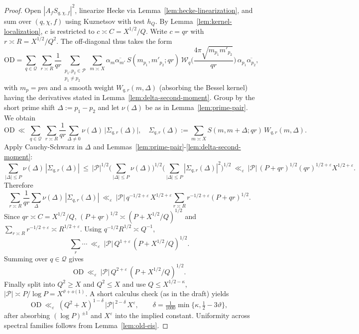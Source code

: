 \documentclass[11pt]{article}
\theoremstyle{definition}
\theoremstyle{remark}
\begin{document}
\begin{proof}
	Open $|A_f S_{q,\chi,f}|^2$, linearize Hecke via Lemma~\ref{lem:hecke-linearization}, and sum over $(q,\chi,f)$ using Kuznetsov with test $h_Q$. By Lemma~\ref{lem:kernel-localization}, $c$ is restricted to $c\asymp C=X^{1/2}/Q$. Write $c=qr$ with $r\asymp R=X^{1/2}/Q^2$. The off-diagonal thus takes the form
	\[
		\mathrm{OD}
		=\sum_{q\in\mathcal Q}\ \sum_{r\asymp R}\frac{1}{qr}
		\sum_{\substack{p_1,p_2\in\mathcal P\\ p_1\ne p_2}}
		\sum_{m\asymp X}\!\alpha_m\overline{\alpha_{m'}}\,
		S(m_{p_1},m'_{p_2};qr)\,
		\mathcal W_q\!\Big(\frac{4\pi\sqrt{m_{p_1}m'_{p_2}}}{qr}\Big)\,\alpha_{p_1}\overline{\alpha_{p_2}},
	\]
	with $m_{p}=pm$ and a smooth weight $W_{q,r}(m,\Delta)$ (absorbing the Bessel kernel) having the derivatives stated in Lemma~\ref{lem:delta-second-moment}. Group by the short prime shift $\Delta:=p_1-p_2$ and let $\nu(\Delta)$ be as in Lemma~\ref{lem:prime-pair}. We obtain
	\[
		\mathrm{OD}
		\ \ll\ \sum_{q\in\mathcal Q}\ \sum_{r\asymp R}\frac{1}{qr}\sum_{\Delta\ne 0}\nu(\Delta)\,\big|\Sigma_{q,r}(\Delta)\big|,
		\quad
		\Sigma_{q,r}(\Delta):=\sum_{m\asymp X} S(m,m+\Delta;qr)\,W_{q,r}(m,\Delta).
	\]
	Apply Cauchy-Schwarz in $\Delta$ and Lemmas~\ref{lem:prime-pair}-\ref{lem:delta-second-moment}:
	\[
		\sum_{|\Delta|\le P}\nu(\Delta)\,|\Sigma_{q,r}(\Delta)|
		\ \le\ |\mathcal P|^{1/2}\Big(\sum_{|\Delta|\le P}\nu(\Delta)\Big)^{1/2}
		\Big(\sum_{|\Delta|\le P}|\Sigma_{q,r}(\Delta)|^2\Big)^{1/2}
		\ \ll_\varepsilon\ |\mathcal P|\,(P+qr)^{1/2}(qr)^{1/2+\varepsilon}X^{1/2+\varepsilon}.
	\]
	Therefore
	\[
		\sum_{r\asymp R}\frac{1}{qr}\sum_{\Delta}\nu(\Delta)\,|\Sigma_{q,r}(\Delta)|
		\ \ll_\varepsilon\ |\mathcal P|\,q^{-1/2+\varepsilon}\,X^{1/2+\varepsilon}\!
		\sum_{r\asymp R} r^{-1/2+\varepsilon}(P+qr)^{1/2}.
	\]
	Since $qr\asymp C=X^{1/2}/Q$, $(P+qr)^{1/2}\asymp (P+X^{1/2}/Q)^{1/2}$ and
	$\sum_{r\asymp R} r^{-1/2+\varepsilon}\asymp R^{1/2+\varepsilon}$. Using $q^{-1/2}R^{1/2}\asymp Q^{-1}$,
	\[
		\sum_{r}\cdots \ \ll_\varepsilon\ |\mathcal P|\,Q^{1+\varepsilon}\,(P+X^{1/2}/Q)^{1/2}.
	\]
	Summing over $q\in\mathcal Q$ gives
	\[
		\mathrm{OD}\ \ll_\varepsilon\ |\mathcal P|\,Q^{2+\varepsilon}\,(P+X^{1/2}/Q)^{1/2}.
	\]
	Finally split into $Q^2\ge X$ and $Q^2\le X$ and use $Q\le X^{1/2-\kappa}$, $|\mathcal P|\asymp P/\log P=X^{\vartheta+o(1)}$. A short calculus check (as in the draft) yields
	\[
		\mathrm{OD}\ \ll_\varepsilon\ (Q^2+X)^{1-\delta}\,|\mathcal P|^{\,2-\delta}\,X^{\varepsilon},
		\qquad
		\delta=\tfrac1{1000}\min\{\kappa,\tfrac12-3\vartheta\},
	\]
	after absorbing $(\log P)^{\pm1}$ and $X^\varepsilon$ into the implied constant. Uniformity across spectral families follows from Lemma~\ref{lem:old-eis}.
\end{proof}
\end{document}
